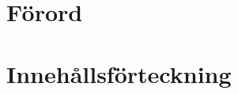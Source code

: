 







\chapter{Förord}




\newpage


\chapter{Innehållsförteckning}
\makeatletter
{}
\makeatother

\newpage











